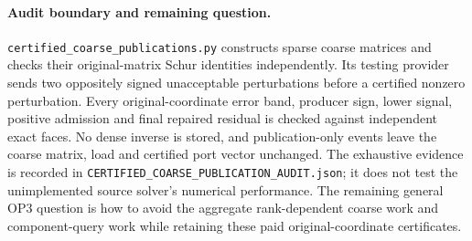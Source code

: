 \paragraph{Audit boundary and remaining question.}
\texttt{certified\_coarse\_publications.py} constructs sparse coarse
matrices and checks their original-matrix Schur identities independently.
Its testing provider sends two oppositely signed unacceptable perturbations
before a certified nonzero perturbation. Every original-coordinate error
band, producer sign, lower signal, positive admission and final repaired
residual is checked against independent exact faces. No dense inverse is
stored, and publication-only events leave the coarse matrix, load and
certified port vector unchanged. The exhaustive evidence is recorded in
\texttt{CERTIFIED\_COARSE\_PUBLICATION\_AUDIT.json}; it does not test the
unimplemented source solver's numerical performance. The remaining general
OP3 question is how to avoid the aggregate rank-dependent coarse work and
component-query work while retaining these paid original-coordinate
certificates.
